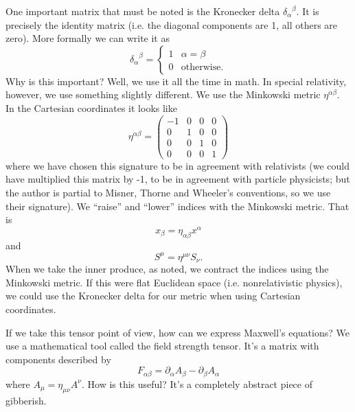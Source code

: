 One important matrix that must be noted is the Kronecker
delta ${\delta_{\alpha}}^{\beta}$. It
is precisely the identity matrix (i.e. the diagonal components
are 1, all others are zero). More formally we can write it as
\begin{equation}%
{\delta_{\alpha}}^{\beta} = \begin{cases} 1 & \alpha=\beta\\
0 & \text{otherwise.}\end{cases}
\end{equation}
Why is this important? Well, we use it all the time in math. In
special relativity, however, we use something slightly
different. We use the Minkowski metric $\eta^{\alpha\beta}$. In
the Cartesian coordinates it looks like
\begin{equation}%
\eta^{\alpha\beta} = \begin{pmatrix} -1 & 0 & 0 & 0\\
0 & 1 & 0 & 0\\
0 & 0 & 1 & 0\\
0 & 0 & 0 & 1
\end{pmatrix}
\end{equation}
where we have chosen this signature to be in agreement with
relativists (we could have multiplied this matrix by -1, to be in
agreement with particle physicists; but the author is partial to
Misner, Thorne and Wheeler's conventions, so we use their
signature). We ``raise'' and ``lower'' indices with the Minkowski
metric. That is
\begin{equation}%
x_{\beta} = \eta_{\alpha\beta}x^{\alpha}
\end{equation}
and
\begin{equation}%
S^{\mu} = \eta^{\mu\nu}S_{\nu}.
\end{equation}
When we take the inner produce, as noted, we contract the indices
using the Minkowski metric. If this were flat Euclidean space
(i.e. nonrelativistic physics), we could use the Kronecker delta
for our metric when using Cartesian coordinates.

If we take this tensor point of view, how can we express Maxwell's
equations? We use a mathematical tool called the field strength
tensor. It's a matrix with components described by
\begin{equation}%
F_{\alpha\beta} = \partial_{\alpha}A_{\beta}-\partial_{\beta}A_{\alpha} 
\end{equation}
where $A_{\mu}=\eta_{\mu\nu}A^{\nu}$. How is this useful? It's a
completely abstract piece of gibberish. 

